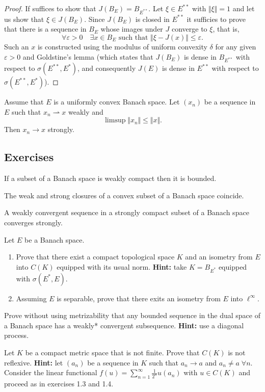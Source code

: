 \documentclass{article}
\theoremstyle{definition}
\numberwithin{equation}{section}
\begin{document}
	\begin{proof}
		If suffices to show that $J(B_E)=B_{E^{**}}$. Let $\xi\in E^{**}$ with $\Vert\xi\Vert=1$ and let us show that $\xi\in J(B_E)$. Since $J(B_E)$ is closed in $E^{**}$ it sufficies to prove that there is a sequence in $B_E$ whose images under $J$ converge to $\xi$, that is,
		\[\forall\varepsilon>0\quad\exists x\in B_E\text{ such that }\Vert\xi-J(x)\Vert\leq\varepsilon.\]
		Such an $x$ is constructed using the modulus of uniform convexity $\delta$ for any given $\varepsilon>0$ and Goldstine's lemma (which states that $J(B_E)$ is dense in $B_{E^{**}}$ with respect to $\sigma(E^{**},E^*)$, and consequently $J(E)$ is dense in $E^{**}$ with respect to $\sigma(E^{**},E^*)$).
	\end{proof}
	\begin{prop}
		Assume that $E$ is a uniformly convex Banach space. Let $(x_n)$ be a sequence in $E$ such that $x_n\rightharpoonup x$ weakly and 
		\[\limsup\Vert x_n\Vert\leq\Vert x\Vert.\]
		Then $x_n\to x$ strongly.
	\end{prop}
	
	\subsection{Exercises}
	\begin{exer*}[3.1]
		If a subset of a Banach space is weakly compact then it is bounded.
	\end{exer*}
	\begin{exer*}[3.3]
		The weak and strong closures of a convex subset of a Banach space coincide.
	\end{exer*}
	\begin{exer*}[3.5]
		A weakly convergent sequence in a strongly compact subset of a Banach space converges strongly.
	\end{exer*}
	\begin{exer*}[3.20]
		Let $E$ be a Banach space.
		\begin{enumerate}
			\item Prove that there exist a compact topological space $K$ and an isometry from $E$ into $C(K)$ equipped with its usual norm. \textbf{Hint:} take $K=B_{E^*}$ equipped with $\sigma(E^*,E)$.
			\item Assuming $E$ is separable, prove that there exits an isometry from $E$ into $\ell^\infty$.
		\end{enumerate}
	\end{exer*}
	\begin{exer*}[3.21]
		Prove without using metrizability that any bounded sequence in the dual space of a Banach space has a weakly* convergent subsequence. \textbf{Hint:} use a diagonal process.
	\end{exer*}
	\begin{exer*}
		Let $K$ be a compact metric space that is not finite. Prove that $C(K)$ is not reflexive. \textbf{Hint:} let $(a_n)$ be a sequence in $K$ such that $a_n\to a$ and $a_n\neq a\;\forall n$. Consider the linear functional $f(u)=\sum_{n=1}^\infty\frac{1}{2^n}u(a_n)$ with $u\in C(K)$ and proceed as in exercises 1.3 and 1.4.
	\end{exer*}
	\clearpage
	
\end{document}
